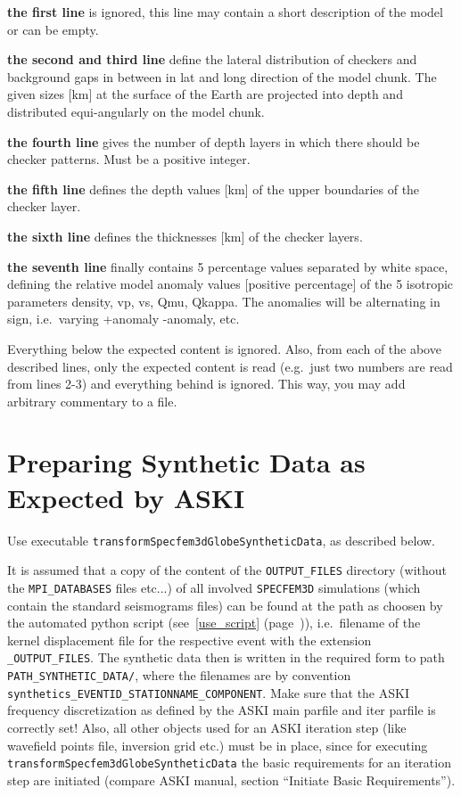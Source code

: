 \documentclass[12pt,a4paper]{article}
\newcommand{\lcode}[1]{\nolinkurl{#1}}
\newcommand{\ASKI}{ {\ttfamily ASKI} }
\newcommand{\myref}[1]{\ref{#1} (page~\pageref{#1})}
\begin{document}
{\bf the first line} is ignored, this line may contain a short description of the model or can be empty.

{\bf the second and third line} define the lateral distribution of checkers and background gaps in between
in lat and long direction of the model chunk. The given sizes [km] at the surface of the Earth are projected 
into depth and distributed equi-angularly on the model chunk.

{\bf the fourth line} gives the number of depth layers in which there should be checker patterns. 
Must be a positive integer.

{\bf the fifth line} defines the depth values [km] of the upper boundaries of the checker layer.

{\bf the sixth line} defines the thicknesses [km] of the checker layers.

{\bf the seventh line} finally contains 5 percentage values separated by white space, defining
the relative model anomaly values [positive percentage] of the 5 isotropic parameters 
density, vp, vs, Qmu, Qkappa. The anomalies will be alternating in sign, i.e.\ varying +anomaly -anomaly, etc.

Everything below the expected content is ignored. Also, from each of the above described lines, only the 
expected content is read (e.g.\ just two numbers are read from lines 2-3) and everything behind is ignored.
This way, you may add arbitrary commentary to a file. 

%
\section{Preparing Synthetic Data as Expected by \ASKI{}} \label{transform_synthetics}
%
Use executable \lcode{transformSpecfem3dGlobeSyntheticData}, as described below.

It is assumed that a copy of the content of the \lcode{OUTPUT_FILES} directory 
(without the \lcode{MPI_DATABASES} files etc...)
of all involved \lcode{SPECFEM3D} simulations (which contain the standard seismograms files) can be found at 
the path as choosen by the automated python script (see~\myref{use_script}), i.e.\ filename of the kernel 
displacement file for the respective event with the extension \lcode{_OUTPUT_FILES}. 
The synthetic data then is written in the required form to path \lcode{PATH_SYNTHETIC_DATA/}, where the 
filenames are by convention \lcode{synthetics_EVENTID_STATIONNAME_COMPONENT}. Make sure that the \ASKI{} frequency 
discretization as defined by the \ASKI{} main parfile and iter parfile is correctly set! Also, all other objects
used for an \ASKI{} iteration step (like wavefield points file, inversion grid etc.) must be in place, since
for executing \lcode{transformSpecfem3dGlobeSyntheticData} the basic requirements for an iteration step
are initiated (compare \ASKI{} manual, section ``Initiate Basic Requirements'').
\end{document}
